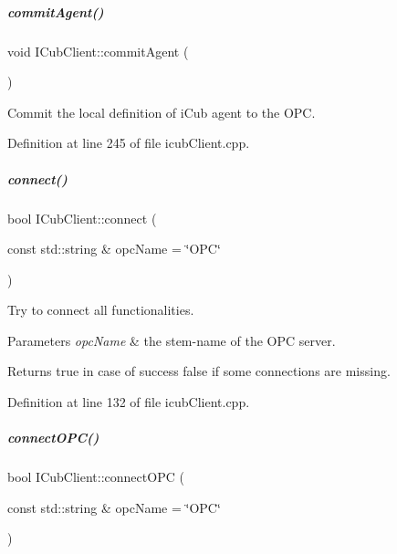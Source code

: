 \mbox{\label{group__icubclient__clients_a514afed176cadaaaee1fca994dde96b5}} 
\subparagraph{\texorpdfstring{commit\+Agent()}{commitAgent()}}
{\footnotesize\ttfamily void I\+Cub\+Client\+::commit\+Agent (\begin{DoxyParamCaption}{ }\end{DoxyParamCaption})}



Commit the local definition of i\+Cub agent to the O\+PC. 



Definition at line 245 of file icub\+Client.\+cpp.

\mbox{\label{group__icubclient__clients_a3909d8199400ef12033f10c070a026a3}} 
\subparagraph{\texorpdfstring{connect()}{connect()}}
{\footnotesize\ttfamily bool I\+Cub\+Client\+::connect (\begin{DoxyParamCaption}\item[{const std\+::string \&}]{opc\+Name = {\ttfamily \char`\"{}OPC\char`\"{}} }\end{DoxyParamCaption})}



Try to connect all functionalities. 


\begin{DoxyParams}{Parameters}
{\em opc\+Name} & the stem-\/name of the O\+PC server. \\
\hline
\end{DoxyParams}
\begin{DoxyReturn}{Returns}
true in case of success false if some connections are missing. 
\end{DoxyReturn}


Definition at line 132 of file icub\+Client.\+cpp.

\mbox{\label{group__icubclient__clients_a62aa694a2b631e84f922188ad44ba7eb}} 
\subparagraph{\texorpdfstring{connect\+O\+P\+C()}{connectOPC()}}
{\footnotesize\ttfamily bool I\+Cub\+Client\+::connect\+O\+PC (\begin{DoxyParamCaption}\item[{const std\+::string \&}]{opc\+Name = {\ttfamily \char`\"{}OPC\char`\"{}} }\end{DoxyParamCaption})}



